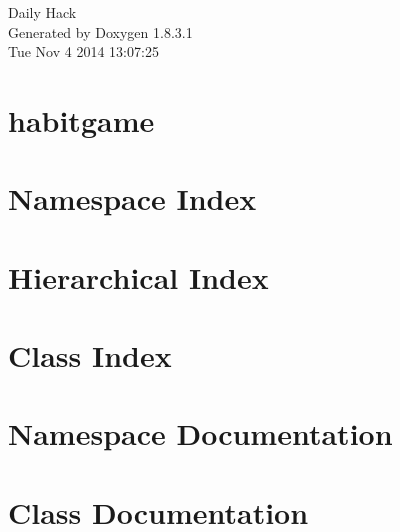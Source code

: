 \documentclass{book}
\begin{document}
\hypersetup{pageanchor=false,citecolor=blue}
\begin{titlepage}
\vspace*{7cm}
\begin{center}
{\Large Daily Hack }\\
\vspace*{1cm}
{\large Generated by Doxygen 1.8.3.1}\\
\vspace*{0.5cm}
{\small Tue Nov 4 2014 13:07:25}\\
\end{center}
\end{titlepage}
\clearemptydoublepage
{}
\tableofcontents
\clearemptydoublepage
{}
\hypersetup{pageanchor=true,citecolor=blue}
\chapter{habitgame}
\label{md_README}
\hypertarget{md_README}{}

\chapter{Namespace Index}

\chapter{Hierarchical Index}

\chapter{Class Index}

\chapter{Namespace Documentation}



\chapter{Class Documentation}




















\printindex
\end{document}
